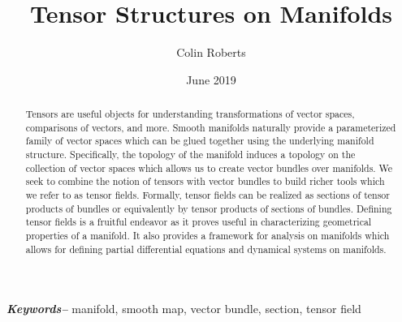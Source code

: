 \documentclass[12pt]{article}
\title{Tensor Structures on Manifolds}
\author{Colin Roberts}
\date{June 2019}
\providecommand{\keywords}[1]
{
    \hspace*{28pt}\small	
  \textbf{\textit{Keywords--}} #1
}
\begin{document}
\begin{titlingpage}
    \maketitle
    \vfill
    \begin{abstract}
        Tensors are useful objects for understanding transformations of vector spaces, comparisons of vectors, and more. Smooth manifolds naturally provide a parameterized family of vector spaces which can be glued together using the underlying manifold structure. Specifically, the topology of the manifold induces a topology on the collection of vector spaces which allows us to create vector bundles over manifolds. We seek to combine the notion of tensors with vector bundles to build richer tools which we refer to as tensor fields. Formally, tensor fields can be realized as sections of tensor products of bundles or equivalently by tensor products of sections of bundles. Defining tensor fields is a fruitful endeavor as it proves useful in characterizing geometrical properties of a manifold. It also provides a framework for analysis on manifolds which allows for defining partial differential equations and dynamical systems on manifolds.
    \end{abstract}
    \keywords{manifold, smooth map, vector bundle, section, tensor field}
\end{titlingpage}


\end{document}

